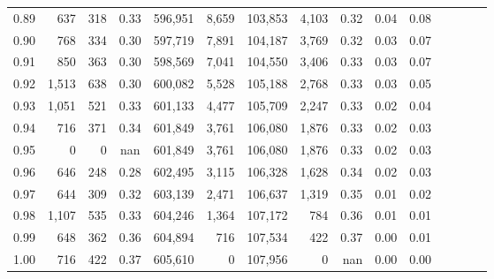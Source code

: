 \begin{tabular}{rrrcrrrrrrrrrrr}
0.89 &     637 &    318 &                                       0.33 &  596,951 &    8,659 &  103,853 &    4,103 &  0.32 &  0.04 &                         0.08 \\
0.90 &     768 &    334 &                                       0.30 &  597,719 &    7,891 &  104,187 &    3,769 &  0.32 &  0.03 &                         0.07 \\
0.91 &     850 &    363 &                                       0.30 &  598,569 &    7,041 &  104,550 &    3,406 &  0.33 &  0.03 &                         0.07 \\
0.92 &   1,513 &    638 &                                       0.30 &  600,082 &    5,528 &  105,188 &    2,768 &  0.33 &  0.03 &                         0.05 \\
0.93 &   1,051 &    521 &                                       0.33 &  601,133 &    4,477 &  105,709 &    2,247 &  0.33 &  0.02 &                         0.04 \\
0.94 &     716 &    371 &                                       0.34 &  601,849 &    3,761 &  106,080 &    1,876 &  0.33 &  0.02 &                         0.03 \\
0.95 &       0 &      0 &                                        nan &  601,849 &    3,761 &  106,080 &    1,876 &  0.33 &  0.02 &                         0.03 \\
0.96 &     646 &    248 &                                       0.28 &  602,495 &    3,115 &  106,328 &    1,628 &  0.34 &  0.02 &                         0.03 \\
0.97 &     644 &    309 &                                       0.32 &  603,139 &    2,471 &  106,637 &    1,319 &  0.35 &  0.01 &                         0.02 \\
0.98 &   1,107 &    535 &                                       0.33 &  604,246 &    1,364 &  107,172 &      784 &  0.36 &  0.01 &                         0.01 \\
0.99 &     648 &    362 &                                       0.36 &  604,894 &      716 &  107,534 &      422 &  0.37 &  0.00 &                         0.01 \\
1.00 &     716 &    422 &                                       0.37 &  605,610 &        0 &  107,956 &        0 &   nan &  0.00 &                         0.00 \\
\bottomrule
\end{tabular}
